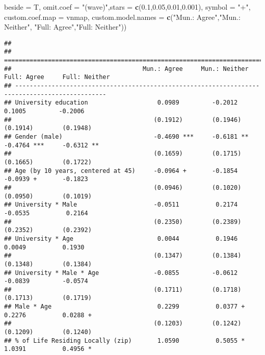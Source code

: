 \documentclass[
]{article}
\newenvironment{Shaded}{\begin{snugshade}}{\end{snugshade}}
\newcommand{\DataTypeTok}[1]{\textcolor[rgb]{0.13,0.29,0.53}{#1}}
\newcommand{\FloatTok}[1]{\textcolor[rgb]{0.00,0.00,0.81}{#1}}
\newcommand{\KeywordTok}[1]{\textcolor[rgb]{0.13,0.29,0.53}{\textbf{#1}}}
\newcommand{\NormalTok}[1]{#1}
\newcommand{\StringTok}[1]{\textcolor[rgb]{0.31,0.60,0.02}{#1}}
\begin{document}
\begin{Shaded}
\begin{Highlighting}[]
          \DataTypeTok{beside =}\NormalTok{ T,}
          \DataTypeTok{omit.coef =} \StringTok{"(wave)"}\NormalTok{,}\DataTypeTok{stars =} \KeywordTok{c}\NormalTok{(}\FloatTok{0.1}\NormalTok{,}\FloatTok{0.05}\NormalTok{,}\FloatTok{0.01}\NormalTok{,}\FloatTok{0.001}\NormalTok{), }\DataTypeTok{symbol =} \StringTok{"+"}\NormalTok{,}
          \DataTypeTok{custom.coef.map =}\NormalTok{ vnmap,}
          \DataTypeTok{custom.model.names =} \KeywordTok{c}\NormalTok{(}\StringTok{"Mun.: Agree"}\NormalTok{,}\StringTok{"Mun.: Neither"}\NormalTok{,}
                                 \StringTok{"Full: Agree"}\NormalTok{,}\StringTok{"Full: Neither"}\NormalTok{))}
\end{Highlighting}
\end{Shaded}

\begin{verbatim}
## 
## ===============================================================================================
##                                    Mun.: Agree     Mun.: Neither  Full: Agree     Full: Neither
## -----------------------------------------------------------------------------------------------
## University education                   0.0989         -0.2012         0.1005         -0.2006   
##                                       (0.1912)        (0.1946)       (0.1914)        (0.1948)  
## Gender (male)                         -0.4690 ***     -0.6181 **     -0.4764 ***     -0.6312 **
##                                       (0.1659)        (0.1715)       (0.1665)        (0.1722)  
## Age (by 10 years, centered at 45)     -0.0964 +       -0.1854        -0.0939 +       -0.1823   
##                                       (0.0946)        (0.1020)       (0.0950)        (0.1019)  
## University * Male                     -0.0511          0.2174        -0.0535          0.2164   
##                                       (0.2350)        (0.2389)       (0.2352)        (0.2392)  
## University * Age                       0.0044          0.1946         0.0049          0.1930   
##                                       (0.1347)        (0.1384)       (0.1348)        (0.1384)  
## University * Male * Age               -0.0855         -0.0612        -0.0839         -0.0574   
##                                       (0.1711)        (0.1718)       (0.1713)        (0.1719)  
## Male * Age                             0.2299          0.0377 +       0.2276          0.0288 + 
##                                       (0.1203)        (0.1242)       (0.1209)        (0.1240)  
## % of Life Residing Locally (zip)       1.0590          0.5055 *       1.0391          0.4956 * 

\end{verbatim}
\end{document}
